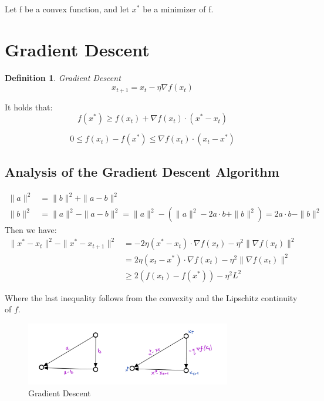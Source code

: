 \documentclass[11pt]{book} %
\newtheorem{definition}{Definition}[section]
\begin{document}
Let f be a convex function, and let $x^*$ be a minimizer of f. 

\section{Gradient Descent}
\begin{definition}{Gradient Descent} \\
    \begin{equation}
       x_{t+1} = x_t - \eta \nabla f(x_t) 
    \end{equation}
\end{definition}

It holds that:
\begin{equation}
    f(x^*) \geq f(x_t) + \nabla f(x_t) \cdot (x^* - x_t)
\end{equation}

\begin{equation}
    0 \leq f(x_t) - f(x^*) \leq \nabla f(x_t) \cdot (x_t - x^*) 
\end{equation}

\subsection{Analysis of the Gradient Descent Algorithm}

\begin{align*}
    \|a\|^2  &= \|b\|^2 + \|a - b\|^2   \\ 
    \|b\|^2 &= \|a\|^2 - \|a - b\|^2 = \|a\|^2 - ( \|a\|^2 - 2a \cdot b + \|b\|^2  ) = 2 a \cdot b - \|b\|^2
\end{align*}
Then we have:
\begin{align*}
    \| x^* - x_t \|^2 - \| x^* - x_{t+1} \|^2 &= - 2 \eta (x^* - x_t) \cdot \nabla f(x_t) - \eta^2 \| \nabla f(x_t) \|^2 \\
    &= 2 \eta (x_t - x^*) \cdot \nabla f(x_t) - \eta^2 \| \nabla f(x_t) \|^2 \\
    &\geq  2 ( f(x_t) - f(x^*) ) - \eta^2 L^2
\end{align*}

Where the last inequality follows from the convexity and the Lipschitz continuity of $f$. 

\begin{figure}[H]
    \centering
    \includegraphics[width=0.8\textwidth]{Figs/vectors_triangle.jpeg}
    \caption{Gradient Descent}
\end{figure}
\end{document}
